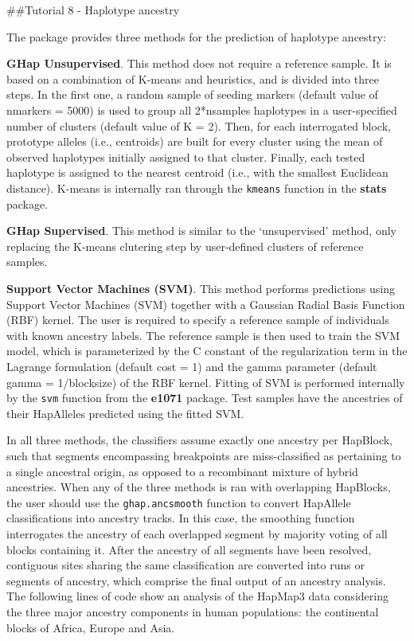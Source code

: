 \documentclass[
]{article}
\begin{document}
\pagebreak

\#\#Tutorial 8 - Haplotype ancestry

The package provides three methods for the prediction of haplotype
ancestry:

\textbf{GHap Unsupervised}. This method does not require a reference
sample. It is based on a combination of K-means and heuristics, and is
divided into three steps. In the first one, a random sample of seeding
markers (default value of nmarkers = 5000) is used to group all
2*nsamples haplotypes in a user-specified number of clusters (default
value of K = 2). Then, for each interrogated block, prototype alleles
(i.e., centroids) are built for every cluster using the mean of observed
haplotypes initially assigned to that cluster. Finally, each tested
haplotype is assigned to the nearest centroid (i.e., with the smallest
Euclidean distance). K-means is internally ran through the
\texttt{kmeans} function in the \textbf{stats} package.

\textbf{GHap Supervised}. This method is similar to the `unsupervised'
method, only replacing the K-means clutering step by user-defined
clusters of reference samples.

\textbf{Support Vector Machines (SVM)}. This method performs predictions
using Support Vector Machines (SVM) together with a Gaussian Radial
Basis Function (RBF) kernel. The user is required to specify a reference
sample of individuals with known ancestry labels. The reference sample
is then used to train the SVM model, which is parameterized by the C
constant of the regularization term in the Lagrange formulation (default
cost = 1) and the gamma parameter (default gamma = 1/blocksize) of the
RBF kernel. Fitting of SVM is performed internally by the \texttt{svm}
function from the \textbf{e1071} package. Test samples have the
ancestries of their HapAlleles predicted using the fitted SVM.

In all three methods, the classifiers assume exactly one ancestry per
HapBlock, such that segments encompassing breakpoints are
miss-classified as pertaining to a single ancestral origin, as opposed
to a recombinant mixture of hybrid ancestries. When any of the three
methods is ran with overlapping HapBlocks, the user should use the
\texttt{ghap.ancsmooth} function to convert HapAllele classifications
into ancestry tracks. In this case, the smoothing function interrogates
the ancestry of each overlapped segment by majority voting of all blocks
containing it. After the ancestry of all segments have been resolved,
contiguous sites sharing the same classification are converted into runs
or segments of ancestry, which comprise the final output of an ancestry
analysis. The following lines of code show an analysis of the HapMap3
data considering the three major ancestry components in human
populations: the continental blocks of Africa, Europe and Asia.
\end{document}
